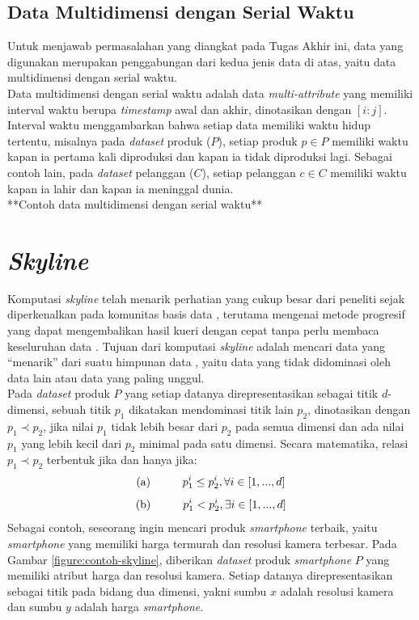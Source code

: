 \subsection{Data Multidimensi dengan Serial Waktu}
\tab Untuk menjawab permasalahan yang diangkat pada Tugas Akhir ini, data yang digunakan merupakan penggabungan dari kedua jenis data di atas, yaitu data multidimensi dengan serial waktu.\\
\tab Data multidimensi dengan serial waktu adalah data \textit{multi-attribute} yang memiliki interval waktu berupa \textit{timestamp} awal dan akhir, dinotasikan dengan $[i:j]$. Interval waktu menggambarkan bahwa setiap data memiliki waktu hidup tertentu, misalnya pada \textit{dataset} produk ($P$), setiap produk $p \in P$ memiliki waktu kapan ia pertama kali diproduksi dan kapan ia tidak diproduksi lagi. Sebagai contoh lain, pada \textit{dataset} pelanggan ($C$), setiap pelanggan $c \in C$ memiliki waktu kapan ia lahir dan kapan ia meninggal dunia.\\

**Contoh data multidimensi dengan serial waktu**

\section{\textit{Skyline}}
\tab Komputasi \textit{skyline} telah menarik perhatian yang cukup besar dari peneliti sejak diperkenalkan pada komunitas basis data \cite{skyline}, terutama mengenai metode progresif yang dapat mengembalikan hasil kueri dengan cepat tanpa perlu membaca keseluruhan data \cite{dynamic-skyline}. Tujuan dari komputasi \textit{skyline} adalah mencari data yang “menarik” dari suatu himpunan data \cite{skyline}, yaitu data yang tidak didominasi oleh data lain atau data yang paling unggul.\\
\tab Pada \textit{dataset} produk $P$ yang setiap datanya direpresentasikan sebagai titik $d$-dimensi, sebuah titik $p_1$ dikatakan mendominasi titik lain $p_2$, dinotasikan dengan  $p_1 \prec p_2$, jika nilai $p_1$ tidak lebih besar dari $p_2$ pada semua dimensi dan ada nilai $p_1$ yang lebih kecil dari $p_2$ minimal pada satu dimensi. Secara matematika, relasi $p_1 \prec p_2$ terbentuk jika dan hanya jika:
\[\text{(a)} \hspace*{1cm} p_1^i \leq p_2^i, \forall i \in [1, ..., d]\] 
\[\text{(b)} \hspace*{1cm} p_1^i < p_2^i, \exists i \in [1, ..., d]\]
\tab Sebagai contoh, seseorang ingin mencari produk \textit{smartphone} terbaik, yaitu \textit{smartphone} yang memiliki harga termurah dan resolusi kamera terbesar. Pada Gambar \ref{figure:contoh-skyline}, diberikan \textit{dataset} produk \textit{smartphone} $P$ yang memiliki atribut harga dan resolusi kamera. Setiap datanya direpresentasikan sebagai titik pada bidang dua dimensi, yakni sumbu $x$ adalah resolusi kamera dan sumbu $y$ adalah harga \textit{smartphone}.\\

